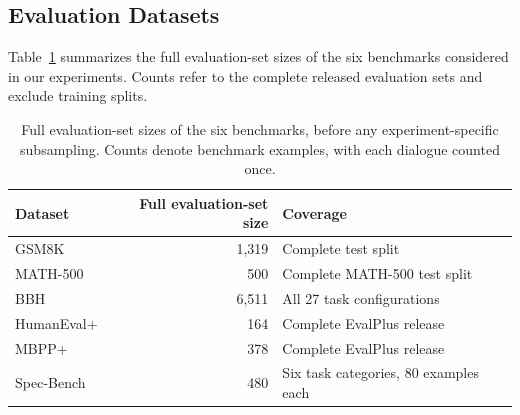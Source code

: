 
\subsection{Evaluation Datasets}
\label{app:evaluation-datasets}

Table~\ref{tab:evaluation-datasets} summarizes the full evaluation-set
sizes of the six benchmarks considered in our experiments.
Counts refer to the complete released evaluation sets and exclude
training splits.

\begin{table}[t]
  \centering
  \small
  \caption{Full evaluation-set sizes of the six benchmarks, before
  any experiment-specific subsampling. Counts denote benchmark
  examples, with each dialogue counted once.}
  \label{tab:evaluation-datasets}
  \begin{tabular}{lrl}
    \toprule
    Dataset & Full evaluation-set size & Coverage \\
    \midrule
    GSM8K      & 1,319 & Complete test split \\
    MATH-500   & 500   & Complete MATH-500 test split \\
    BBH        & 6,511 & All 27 task configurations \\
    HumanEval+ & 164   & Complete EvalPlus release \\
    MBPP+      & 378   & Complete EvalPlus release \\
    Spec-Bench~\cite{xia2024unlocking}
               & 480   & Six task categories, 80 examples each \\
    \bottomrule
  \end{tabular}
\end{table}

